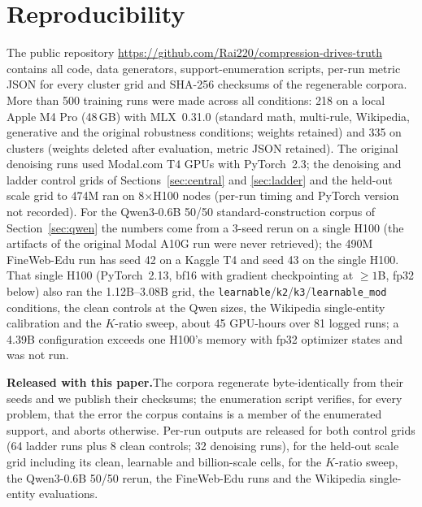 \documentclass{article}
\begin{document}



\appendix

\section{Reproducibility}
\label{app:reproducibility}

The public repository \url{https://github.com/Rai220/compression-drives-truth} contains all code, data generators, support-enumeration scripts, per-run metric JSON for every cluster grid and SHA-256 checksums of the regenerable corpora. More than 500 training runs were made across all conditions: 218 on a local Apple M4 Pro (48\,GB) with MLX~0.31.0 (standard math, multi-rule, Wikipedia, generative and the original robustness conditions; weights retained) and 335 on clusters (weights deleted after evaluation, metric JSON retained). The original denoising runs used Modal.com T4 GPUs with PyTorch~2.3; the denoising and ladder control grids of Sections~\ref{sec:central} and \ref{sec:ladder} and the held-out scale grid to 474M ran on 8${\times}$H100 nodes (per-run timing and PyTorch version not recorded). For the Qwen3-0.6B 50/50 standard-construction corpus of Section~\ref{sec:qwen} the numbers come from a 3-seed rerun on a single H100 (the artifacts of the original Modal A10G run were never retrieved); the 490M FineWeb-Edu run has seed 42 on a Kaggle T4 and seed 43 on the single H100. That single H100 (PyTorch~2.13, bf16 with gradient checkpointing at ${\geq}1$B, fp32 below) also ran the 1.12B--3.08B grid, the \texttt{learnable}/\texttt{k2}/\texttt{k3}/\texttt{learnable\_mod} conditions, the clean controls at the Qwen sizes, the Wikipedia single-entity calibration and the $K$-ratio sweep, about 45 GPU-hours over 81 logged runs; a 4.39B configuration exceeds one H100's memory with fp32 optimizer states and was not run.

\textbf{Released with this paper.}\quad The corpora regenerate byte-identically from their seeds and we publish their checksums; the enumeration script verifies, for every problem, that the error the corpus contains is a member of the enumerated support, and aborts otherwise. Per-run outputs are released for both control grids (64 ladder runs plus 8 clean controls; 32 denoising runs), for the held-out scale grid including its clean, learnable and billion-scale cells, for the $K$-ratio sweep, the Qwen3-0.6B 50/50 rerun, the FineWeb-Edu runs and the Wikipedia single-entity evaluations.
\end{document}
